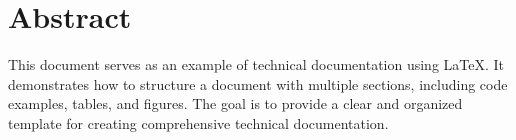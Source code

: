 \section*{Abstract}
This document serves as an example of technical documentation using LaTeX. It demonstrates how to structure a document with multiple sections, including code examples, tables, and figures. The goal is to provide a clear and organized template for creating comprehensive technical documentation.


\newpage